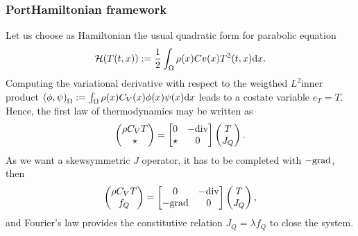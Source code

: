 \documentclass[letterpaper,10pt,english]{sphinxmanual}
\begin{document}
\subsubsection{Port\sphinxhyphen{}Hamiltonian framework}
\label{\detokenize{examples/heat:port-hamiltonian-framework}}
\sphinxAtStartPar
Let us choose as Hamiltonian the usual quadratic form for parabolic
equation
\begin{equation*}
\begin{split}\mathcal{H}(T(t,x)) := \frac{1}{2} \int_\Omega \rho(x) Cv(x) T^2(t,x) {\rm d}x.\end{split}
\end{equation*}
\sphinxAtStartPar
Computing the variational derivative with respect to the weigthed
\(L^2\)\sphinxhyphen{}inner product
\(\left( \phi, \psi \right)_\Omega := \int_\Omega \rho(x) C_V(x) \phi(x) \psi(x) {\rm d} x\)
leads to a co\sphinxhyphen{}state variable \(e_T = T\). Hence, the first law of
thermodynamics may be written as
\begin{equation*}
\begin{split}\begin{pmatrix} \rho C_V T \\ \star \end{pmatrix} = \begin{bmatrix} 0 & -{\rm div} \\ \star & 0 \end{bmatrix} \begin{pmatrix} T \\ J_Q \end{pmatrix}.\end{split}
\end{equation*}
\sphinxAtStartPar
As we want a  skew\sphinxhyphen{}symmetric \(J\) operator, it has to be
completed with \(-{\rm grad}\), then
\begin{equation*}
\begin{split}\begin{pmatrix} \rho C_V T \\ f_Q \end{pmatrix} = \begin{bmatrix} 0 & -{\rm div} \\ -{\rm grad} & 0 \end{bmatrix} \begin{pmatrix} T \\ J_Q \end{pmatrix},\end{split}
\end{equation*}
\sphinxAtStartPar
and Fourier’s law provides the constitutive relation
\(J_Q = \lambda f_Q\) to close the system.
\end{document}
